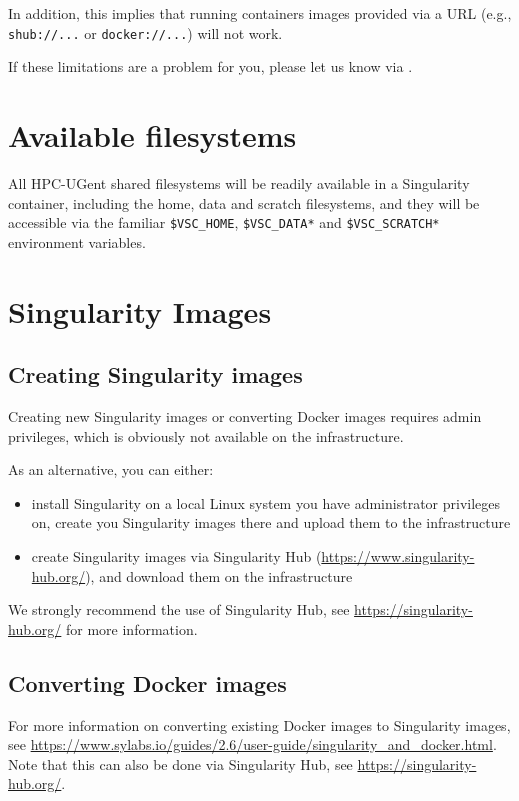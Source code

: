 In addition, this implies that running containers images provided via a URL
(e.g., \lstinline|shub://...| or \lstinline|docker://...|) will not work.

If these limitations are a problem for you, please let us know via \hpcinfo.

\section{Available filesystems}

All HPC-UGent shared filesystems will be readily available in a Singularity container,
including the home, data and scratch filesystems, and they will be accessible via the
familiar \lstinline|$VSC_HOME|, \lstinline|$VSC_DATA*| and \lstinline|$VSC_SCRATCH*| environment variables.

\section{Singularity Images}

\subsection{Creating Singularity images}

Creating new Singularity images or converting Docker images requires admin privileges,
which is obviously not available on the \hpcInfra infrastructure.

As an alternative, you can either:

\begin{itemize}
    \item install Singularity on a local Linux system you have administrator privileges on,
        create you Singularity images there and upload them to the \hpcInfra infrastructure
    \item create Singularity images via Singularity Hub (\url{https://www.singularity-hub.org/}),
        and download them on the \hpcInfra infrastructure
\end{itemize}

We strongly recommend the use of Singularity Hub, see \url{https://singularity-hub.org/} for more information.

\subsection{Converting Docker images}

For more information on converting existing Docker images to Singularity images,
see \url{https://www.sylabs.io/guides/2.6/user-guide/singularity_and_docker.html}.
Note that this can also be done via Singularity Hub, see \url{https://singularity-hub.org/}.

